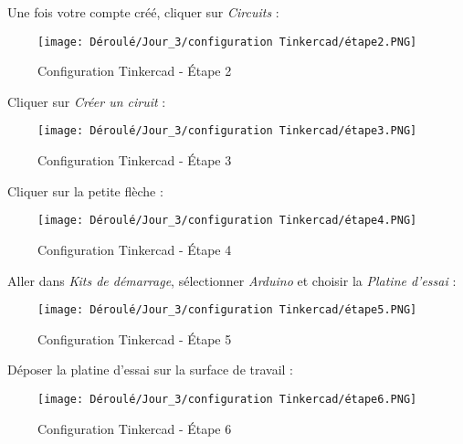 \begin{flushleft}
\textbullet \, Une fois votre compte créé, cliquer sur \textit{Circuits} :
\begin{figure}[!h]
    \centering
    \texttt{[image: Déroulé/Jour\_3/configuration Tinkercad/étape2.PNG]}
    \caption[\'Etape 2]{Configuration Tinkercad - \'Etape 2}
    \label{fig:my_label}
\end{figure}

\newpage

\textbullet \, Cliquer sur \textit{Créer un ciruit} :
\begin{figure}[!h]
    \centering
    \texttt{[image: Déroulé/Jour\_3/configuration Tinkercad/étape3.PNG]}
    \caption[\'Etape 3]{Configuration Tinkercad - \'Etape 3}
    \label{fig:my_label}
\end{figure}

\textbullet \, Cliquer sur la petite flèche :
\begin{figure}[!h]
    \centering
    \texttt{[image: Déroulé/Jour\_3/configuration Tinkercad/étape4.PNG]}
    \caption[\'Etape 4]{Configuration Tinkercad - \'Etape 4}
    \label{fig:my_label}
\end{figure}

\textbullet \, Aller dans \textit{Kits de démarrage}, sélectionner \textit{Arduino} et choisir la \textit{Platine d'essai} :
\begin{figure}[!h]
    \centering
    \texttt{[image: Déroulé/Jour\_3/configuration Tinkercad/étape5.PNG]}
    \caption[\'Etape 5]{Configuration Tinkercad - \'Etape 5}
    \label{fig:my_label}
\end{figure}

\newpage

\textbullet \, Déposer la platine d'essai sur la surface de travail :
\begin{figure}[!h]
    \centering
    \texttt{[image: Déroulé/Jour\_3/configuration Tinkercad/étape6.PNG]}
    \caption[\'Etape 6]{Configuration Tinkercad - \'Etape 6}
    \label{fig:my_label}
\end{figure}
\end{flushleft}